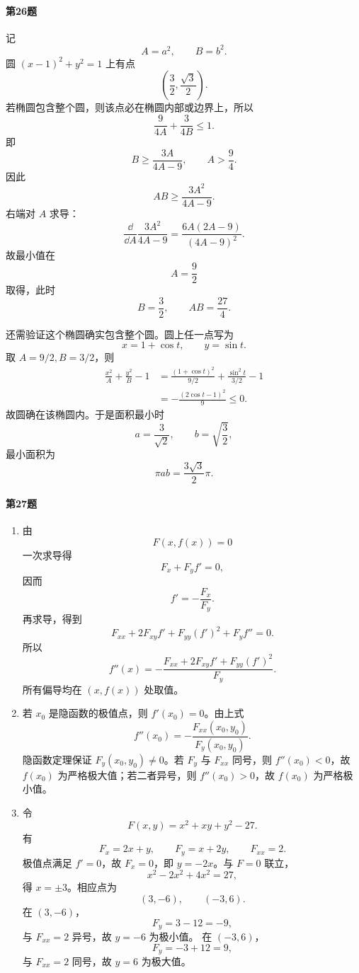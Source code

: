 \paragraph{第26题}
\begin{xsolution}
记
\[
  A=a^2,
  \qquad
  B=b^2.
\]
圆 $(x-1)^2+y^2=1$ 上有点
\[
  \left(\frac32,\frac{\sqrt3}{2}\right).
\]
若椭圆包含整个圆，则该点必在椭圆内部或边界上，所以
\[
  \frac{9}{4A}+\frac{3}{4B}\le1.
\]
即
\[
  B\ge\frac{3A}{4A-9},
  \qquad A>\frac94.
\]
因此
\[
  AB\ge\frac{3A^2}{4A-9}.
\]
右端对 $A$ 求导：
\[
  \frac{\dd}{\dd A}\frac{3A^2}{4A-9}
  =\frac{6A(2A-9)}{(4A-9)^2}.
\]
故最小值在
\[
  A=\frac92
\]
取得，此时
\[
  B=\frac32,
  \qquad
  AB=\frac{27}{4}.
\]

还需验证这个椭圆确实包含整个圆。圆上任一点写为
\[
  x=1+\cos t,
  \qquad
  y=\sin t.
\]
取 $A=9/2,B=3/2$，则
\[
\begin{aligned}
  \frac{x^2}{A}+\frac{y^2}{B}-1
  &=\frac{(1+\cos t)^2}{9/2}
  +\frac{\sin^2t}{3/2}-1\\
  &=-\frac{(2\cos t-1)^2}{9}\le0.
\end{aligned}
\]
故圆确在该椭圆内。于是面积最小时
\[
  a=\frac3{\sqrt2},
  \qquad
  b=\sqrt{\frac32},
\]
最小面积为
\[
  \pi ab=\frac{3\sqrt3}{2}\pi.
\]
\end{xsolution}

\paragraph{第27题}
\begin{xsolution}
\begin{enumerate}[label=(\arabic*)]
  \item 由
  \[
    F(x,f(x))=0
  \]
  一次求导得
  \[
    F_x+F_yf'=0,
  \]
  因而
  \[
    f'=-\frac{F_x}{F_y}.
  \]
  再求导，得到
  \[
    F_{xx}+2F_{xy}f'+F_{yy}(f')^2+F_yf''=0.
  \]
  所以
  \[
    f''(x)
    =-\frac{F_{xx}+2F_{xy}f'+F_{yy}(f')^2}{F_y}.
  \]
  所有偏导均在 $(x,f(x))$ 处取值。

  \item 若 $x_0$ 是隐函数的极值点，则 $f'(x_0)=0$。由上式
  \[
    f''(x_0)=-\frac{F_{xx}(x_0,y_0)}{F_y(x_0,y_0)}.
  \]
  隐函数定理保证 $F_y(x_0,y_0)\ne0$。若 $F_y$ 与 $F_{xx}$ 同号，则 $f''(x_0)<0$，故 $f(x_0)$ 为严格极大值；若二者异号，则 $f''(x_0)>0$，故 $f(x_0)$ 为严格极小值。

  \item 令
  \[
    F(x,y)=x^2+xy+y^2-27.
  \]
  有
  \[
    F_x=2x+y,
    \qquad
    F_y=x+2y,
    \qquad
    F_{xx}=2.
  \]
  极值点满足 $f'=0$，故 $F_x=0$，即 $y=-2x$。与 $F=0$ 联立，
  \[
    x^2-2x^2+4x^2=27,
  \]
  得 $x=\pm3$。相应点为
  \[
    (3,-6),
    \qquad
    (-3,6).
  \]
  在 $(3,-6)$，
  \[
    F_y=3-12=-9,
  \]
  与 $F_{xx}=2$ 异号，故 $y=-6$ 为极小值。
  在 $(-3,6)$，
  \[
    F_y=-3+12=9,
  \]
  与 $F_{xx}=2$ 同号，故 $y=6$ 为极大值。
\end{enumerate}
\end{xsolution}

